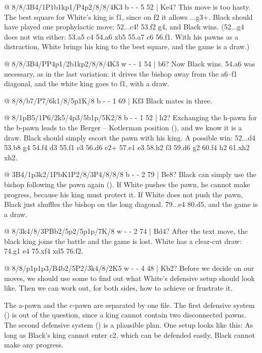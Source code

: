 @ 8/8/3B4/1P1b1kp1/P4p2/8/8/4K3 b - - 5 52 | Ke4?
This move is too hasty. The best square for White's king is f1, since on f2 it allows ...g3+. Black should have played one prophylactic move: 52...\B c4! 53.\K f2 g4, and Black wins. (52...g4 does not win either: 53.a5 \B c4 54.a6 \B xb5 55.a7 \B c6 56.\K f1. With his pawns as a distraction, White brings his king to the best square, and the game is a draw.)

@ 8/8/3B4/PP4p1/2b1kp2/8/8/4K3 w - - 1 54 | b6?
Now Black wins. 54.a6 was necessary, as in the last variation: it drives the bishop away from the a6--f1 diagonal, and the white king goes to f1, with a draw.

@ 8/8/b7/P7/6k1/8/5p1K/8 b - - 1 69 | Kf3
Black mates in three.

@ 8/1pB5/1P6/2k5/4p3/5b1p/5K2/8 b - - 1 52 | h2?
Exchanging the h-pawn for the b-pawn leads to the Berger -- Kotlerman position (), and we know it is a draw. Black should simply escort the pawn with his king. A possible win: 52...\K d4 53.\B b8 \B g4 54.\B f4 \K d3 55.\K f1 e3 56.\B d6 e2+ 57.\K e1 \K e3 58.\B h2 \K f3 59.\B d6 \K g2 60.\B f4 h2 61.\B xh2 \K xh2.

@ 3B4/1p3k2/1PbK1P2/8/3P4/8/8/8 b - - 2 79 | Be8?
Black can simply use the bishop following the pawn again (). If White pushes the pawn, he cannot make progress, because his king must protect it. If White does not push the pawn, Black just shuffles the bishop on the long diagonal. 79...\B e4 80.d5, and the game is a draw.

@ 8/3k4/8/3PBb2/5p2/5p1p/7K/8 w - - 2 74 | Bd4?
After the text move, the black king joins the battle and the game is lost. White has a clear-cut draw: 74.\K g1 \B e4 75.\B xf4 \B xd5 76.\K f2.

@ 8/8/p1p1p3/B4b2/5P2/3k4/8/2K5 w - - 4 48 | Kb2?
Before we decide on our moves, we should use some
 to find out what White's
defensive setup should look like. Then we can work out, for both sides, how to achieve or
frustrate it.

The a-pawn and the c-pawn are separated by one file. The first defensive system
() is out of the question, since a king cannot contain two
disconnected pawns. The second defensive system
() is a
plausible plan. One setup looks like this:
As long as Black's king cannot enter c2, which can be defended easily, Black cannot make any
progress.

